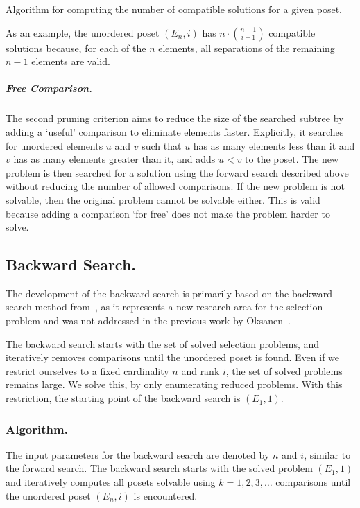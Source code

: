 \documentclass[a4paper,UKenglish,cleveref, autoref, thm-restate]{lipics-v2021}
\begin{document}
\begin{algorithm}[t]
  \centering
  
  \caption{Algorithm for computing the number of compatible solutions for a given poset.}
  \label{algo:compatible_solutions}
\end{algorithm}

As an example, the unordered poset $(E_n, i)$ has $n \cdot \binom{n - 1}{i - 1}$ compatible solutions because, for each of the $n$ elements, all separations of the remaining $n - 1$ elements are valid.


\subparagraph{Free Comparison.}
The second pruning criterion aims to reduce the size of the searched subtree by adding a `useful' comparison to eliminate elements faster.
Explicitly, it searches for unordered elements $u$ and $v$ such that $u$ has as many elements less than it and $v$ has as many elements greater than it, and adds $u < v$ to the poset.
The new problem is then searched for a solution using the forward search described above without reducing the number of allowed comparisons.
If the new problem is not solvable, then the original problem cannot be solvable either.
This is valid because adding a comparison `for free' does not make the problem harder to solve.

\subsection{Backward Search.} \label{sec:backward}
The development of the backward search is primarily based on the backward search method from~\cite{stober2022lower}, as it represents a new research area for the selection problem and was not addressed in the previous work by Oksanen~\cite{Oksanen}.

The backward search starts with the set of solved selection problems, and iteratively removes comparisons until the unordered poset is found.
Even if we restrict ourselves to a fixed cardinality $n$ and rank $i$, the set of solved problems remains large.
We solve this, by only enumerating reduced problems.
With this restriction, the starting point of the backward search is $(E_1, 1)$.

\subsubsection{Algorithm.} \label{sec:backward:algorithm}
The input parameters for the backward search are denoted by $n$ and $i$, similar to the forward search.
The backward search starts with the solved problem $(E_1, 1)$ and iteratively computes all posets solvable using $k = 1, 2, 3, \dots$ comparisons until the unordered poset $(E_n, i)$ is encountered.
\end{document}
